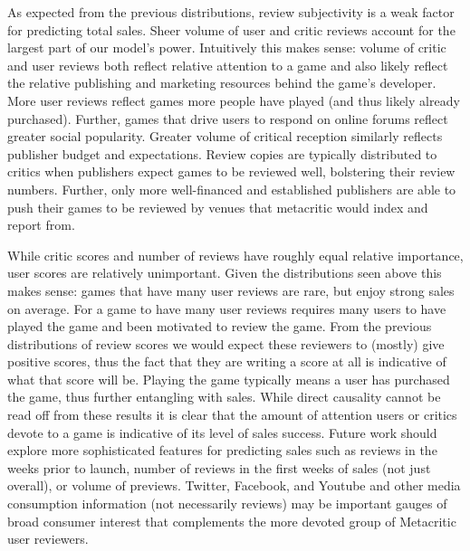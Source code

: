\documentclass[letterpaper]{article}
\begin{document}
As expected from the previous distributions, review subjectivity is a weak factor for predicting total sales. Sheer volume of user and critic reviews account for the largest part of our model's power. Intuitively this makes sense: volume of critic and user reviews both reflect relative attention to a game and also likely reflect the relative publishing and marketing resources behind the game's developer. More user reviews reflect games more people have played (and thus likely already purchased). Further, games that drive users to respond on online forums reflect greater social popularity. Greater volume of critical reception similarly reflects publisher budget and expectations. Review copies are typically distributed to critics when publishers expect games to be reviewed well, bolstering their review numbers. Further, only more well-financed and established publishers are able to push their games to be reviewed by venues that metacritic would index and report from.

While critic scores and number of reviews have roughly equal relative importance, user scores are relatively unimportant. Given the distributions seen above this makes sense: games that have many user reviews are rare, but enjoy strong sales on average. For a game to have many user reviews requires many users to have played the game and been motivated to review the game. From the previous distributions of review scores we would expect these reviewers to (mostly) give positive scores, thus the fact that they are writing a score at all is indicative of what that score will be. Playing the game typically means a user has purchased the game, thus further entangling with sales. While direct causality cannot be read off from these results it is clear that the amount of attention users or critics devote to a game is indicative of its level of sales success. Future work should explore more sophisticated features for predicting sales such as reviews in the weeks prior to launch, number of reviews in the first weeks of sales (not just overall), or volume of previews. Twitter, Facebook, and Youtube and other media consumption information (not necessarily reviews) may be important gauges of broad consumer interest that complements the more devoted group of Metacritic user reviewers.
\end{document}
